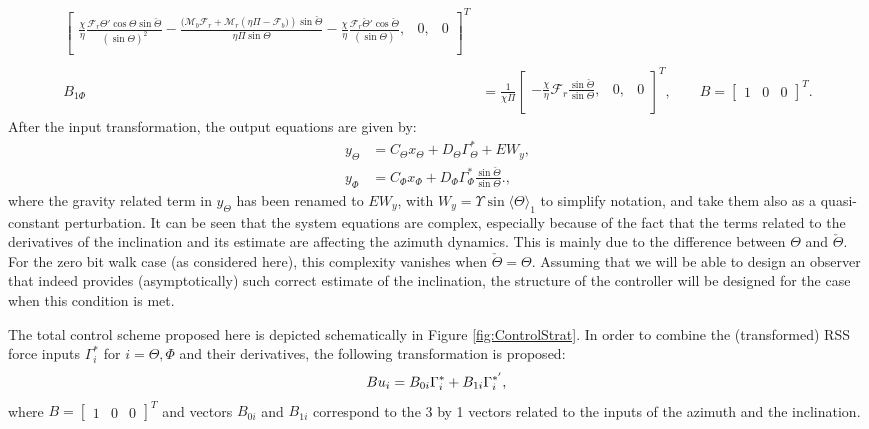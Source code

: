 \documentclass[../main.tex]{subfiles}
\begin{document}
\begin{align}
\begin{bmatrix}
		{\frac{\chi }{\eta }\frac{{{\mathcal{F}_r}\Theta '\cos \Theta \sin \check{\Theta} }}{{{{\left( {\sin \Theta } \right)}^2}}}
			- \frac{{{(\mathcal{M}_b}{\mathcal{F}_r} + {\mathcal{M}_r}\left( {\eta \Pi  - {\mathcal{F}_b}}) \right)\sin\check{\Theta}}}{{\eta \Pi \sin \Theta }} - \frac{\chi }{\eta }\frac{{{\mathcal{F}_r}\check{\Theta} '\cos \check{\Theta}}}{{{{\left( {\sin \Theta } \right)}}}}},   & 0,             & 0           \\
		\end{bmatrix}^{T} \nonumber \\ \nonumber
		\\ \nonumber
		B_{1\Phi}&= \frac{1}{\chi\Pi}\begin{bmatrix}
		-\frac{\chi}{\eta}\mathcal{F}_r\frac{\sin \check{\Theta}}{\sin \Theta} ,    & 0,            & 0            \\
		\end{bmatrix}^{T}, \qquad B = \begin{bmatrix}1 & 0 & 0\end{bmatrix}^T.
	\end{align}
	After the input transformation, the output equations are given by:
	\begin{align}
		y_\Theta &= C_\Theta x_\Theta + D_\Theta \Gamma_\Theta^* + E W_y, \label{eq:output12}\\
		y_\Phi &= C_\Phi x_\Phi + D_\Phi \Gamma_\Phi^*	\frac{\sin \check{\Theta}}{\sin \Theta}	.\label{eq:output22},	
	\end{align}
	where the gravity related term in $y_\Theta$ has been renamed to $E W_y$, with $W_y = \Upsilon \sin \langle \Theta \rangle_1$ to simplify notation, and take them also as a quasi-constant perturbation. It can be seen that the system equations are complex, especially because of the fact that the terms related to the derivatives of the inclination and its estimate are affecting the azimuth dynamics. This is mainly due to the difference between $\Theta$ and $\check{\Theta}$. For the zero bit walk case (as considered here), this complexity vanishes when $\check{\Theta} = \Theta$. Assuming that we will be able to design an observer that indeed provides (asymptotically) such correct estimate of the inclination, the structure of the controller will be designed for the case when this condition is met.	
		
	The total control scheme proposed here is depicted schematically in Figure \ref{fig:ControlStrat}. In order to combine the (transformed) RSS force inputs $\Gamma_i^*$ for $i = \Theta, \Phi$ and their derivatives, the following transformation is proposed:
	\begin{equation}
		B u_i = B_{0i}\Gamma_i^* + B_{1i}\Gamma_i^{*'}, 	\label{eq:inputs1}\\
	\end{equation}
	where $B = \begin{bmatrix} 1 & 0 & 0\end{bmatrix}^T$ and vectors $B_{0i}$ and $B_{1i}$ correspond to the 3 by 1 vectors related to the inputs of the azimuth and the inclination.
	
\end{document}
